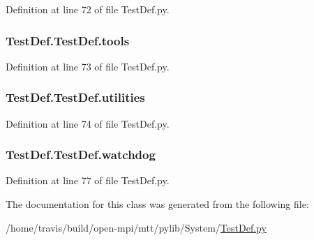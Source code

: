 Definition at line 72 of file Test\-Def.\-py.

\hypertarget{class_test_def_1_1_test_def_a2414cc1583555b0c758e0f9f0952a787}{
\subsubsection[{tools}]{\setlength{\rightskip}{0pt plus 5cm}Test\-Def.\-Test\-Def.\-tools}}\label{class_test_def_1_1_test_def_a2414cc1583555b0c758e0f9f0952a787}


Definition at line 73 of file Test\-Def.\-py.

\hypertarget{class_test_def_1_1_test_def_a0b9ea6f06c02401ad62e06c4cfd80bd2}{
\subsubsection[{utilities}]{\setlength{\rightskip}{0pt plus 5cm}Test\-Def.\-Test\-Def.\-utilities}}\label{class_test_def_1_1_test_def_a0b9ea6f06c02401ad62e06c4cfd80bd2}


Definition at line 74 of file Test\-Def.\-py.

\hypertarget{class_test_def_1_1_test_def_a40da46aa95507cffa798cb152fa69e27}{
\subsubsection[{watchdog}]{\setlength{\rightskip}{0pt plus 5cm}Test\-Def.\-Test\-Def.\-watchdog}}\label{class_test_def_1_1_test_def_a40da46aa95507cffa798cb152fa69e27}


Definition at line 77 of file Test\-Def.\-py.



The documentation for this class was generated from the following file\-:\begin{DoxyCompactItemize}
\item 
/home/travis/build/open-\/mpi/mtt/pylib/\-System/\hyperlink{_test_def_8py}{Test\-Def.\-py}\end{DoxyCompactItemize}
